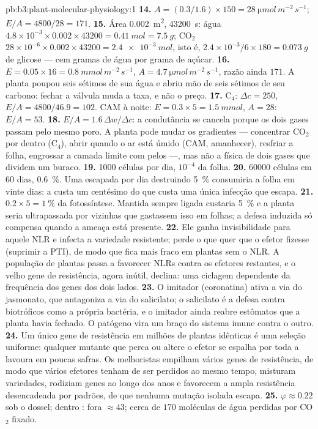 \begin{solution}{pb:b3:plant-molecular-physiology:1}
\textbf{14.} $A = (0.3/1.6)\times 150 = \qty{28}{\micro mol\,m^{-2}\,s^{-1}}$;
$E/A = 4800/28 = 171$.
\textbf{15.} Área \qty{0.002}{m^2}, \num{43200}~s: água $4.8\times
10^{-3}\times 0.002\times\num{43200} = \qty{0.41}{mol} = \qty{7.5}{g}$;
CO$_{2}$ $28\times 10^{-6}\times 0.002\times\num{43200} =
\qty{2.4e-3}{mol}$, isto é, $2.4\times 10^{-3}/6\times 180 =
\qty{0.073}{g}$ de glicose --- cem gramas de água por grama de açúcar.
\textbf{16.} $E = 0.05\times 16 = \qty{0.8}{mmol\,m^{-2}\,s^{-1}}$,
$A = \qty{4.7}{\micro mol\,m^{-2}\,s^{-1}}$, razão ainda $171$. A planta
poupou seis sétimos de sua água e abriu mão de seis sétimos de seu
carbono: fechar a válvula muda a taxa, e não o preço.
\textbf{17.} C$_{4}$: $\Delta c = 250$, $E/A = 4800/46.9 = 102$. CAM à
noite: $E = 0.3\times 5 = \qty{1.5}{mmol}$, $A = 28$: $E/A = 53$.
\textbf{18.} $E/A = 1.6\,\Delta w/\Delta c$: a condutância se cancela
porque os dois gases passam pelo mesmo poro. A planta pode mudar os
gradientes --- concentrar CO$_{2}$ por dentro (C$_{4}$), abrir quando o
ar está úmido (CAM, amanhecer), resfriar a folha, engrossar a camada
limite com pelos ---, mas não a física de dois gases que dividem um
buraco.
\textbf{19.} \num{1000} células por dia, $10^{-4}$ da folha.
\textbf{20.} \num{60000} células em 60 dias, \qty{0.6}{\%}. Uma escapada
por dia destruindo \qty{5}{\%} consumiria a folha em vinte dias: a
 custa um centésimo do que custa uma única
infecção que escapa.
\textbf{21.} $0.2\times 5 = \qty{1}{\%}$ da fotossíntese. Mantida sempre
ligada custaria \qty{5}{\%} e a planta seria ultrapassada por vizinhas
que gastassem isso em folhas; a defesa induzida só compensa quando a
ameaça está presente.
\textbf{22.} Ele ganha invisibilidade para aquele NLR e infecta a
variedade resistente; perde o que quer que o efetor fizesse (suprimir a
PTI), de modo que fica mais fraco em plantas sem o NLR. A população de
plantas passa a favorecer NLRs contra os efetores restantes, e o velho
gene de resistência, agora inútil, declina: uma ciclagem dependente da
frequência dos genes dos dois lados.
\textbf{23.} O imitador (coronatina) ativa a via do jasmonato, que
antagoniza a via do salicilato; o salicilato é a defesa contra
biotróficos como a própria bactéria, e o imitador ainda reabre estômatos
que a planta havia fechado. O patógeno vira um braço do sistema imune
contra o outro.
\textbf{24.} Um único gene de resistência em milhões de plantas
idênticas é uma seleção uniforme: qualquer mutante que perca ou altere o
efetor se espalha por toda a lavoura em poucas safras. Os melhoristas
empilham vários genes de resistência, de modo que vários efetores tenham
de ser perdidos ao mesmo tempo, misturam variedades, rodiziam genes ao
longo dos anos e favorecem a ampla resistência desencadeada por padrões,
de que nenhuma mutação isolada escapa.
\textbf{25.} $\varphi \approx 0.22$ sob o dossel;  dentro :
fora $\approx 43$; cerca de $170$ moléculas de água perdidas por
CO$_{2}$ fixado.
\end{solution}
